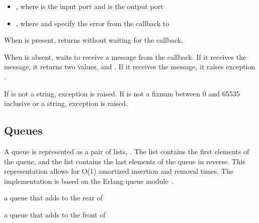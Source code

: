 \begin{itemize}
\item {}, where  is the input port and  is the
  output port
\item {}, where  and  specify the
  error from the callback to 
\end{itemize}

When  is present,  returns
 without waiting for the callback.

When  is absent,  waits to receive a
message from the callback. If it receives the 
message, it returns two values,  and . If it receives
the  message, it raises exception
.

If  is not a string, exception  is raised. If  is not a
fixnum between 0 and 65535 inclusive or a string, exception
 is raised.

\subsection {Queues}

A queue is represented as a pair of lists,
. The  list contains the first
elements of the queue, and the  list contains the last
elements of the queue in reverse. This representation allows for O(1)
amortized insertion and removal times. The implementation is based on
the Erlang queue module~\cite{queue-ref}.

\begin{procedure}
\end{procedure}
\returns{} a queue that adds  to the rear of 

\begin{procedure}
\end{procedure}
\returns{} a queue that adds  to the front of 


